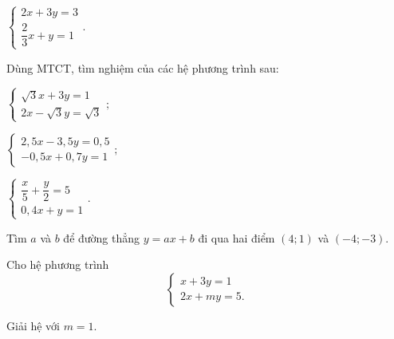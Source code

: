 \begin{practice}
\begin{questions}[resume=SBT]
\begin{questions}
            \answerline
            \answerline
            \answerline

            \item $\begin{cases}2x+3y=3\\\dfrac{2}{3}x+y=1\end{cases}.$

            \answerline
            \answerline
            \answerline
        \end{questions}

        \item Dùng MTCT, tìm nghiệm của các hệ phương trình sau:
        \begin{questions}
            \item $\begin{cases}\sqrt{3}x+3y=1\\2x-\sqrt{3}y=\sqrt{3}\end{cases};$

            \answerline

            \item $\begin{cases}2{,}5x-3{,}5y=0{,}5\\-0{,}5x+0{,}7y=1\end{cases};$

            \answerline

            \item $\begin{cases}\dfrac{x}{5}+\dfrac{y}{2}=5\\0{,}4x+y=1\end{cases}.$

            \answerline
        \end{questions}

        \item Tìm $a$ và $b$ để đường thẳng $y=ax+b$ đi qua hai điểm $(4;1)$ và $(-4;-3)$.

        \answerline
        \answerline

        \item Cho hệ phương trình
        \[
            \begin{cases}
                x+3y=1\\
                2x+my=5.
            \end{cases}
        \]
        \begin{questions}
            \item Giải hệ với $m=1$.


\end{questions}
\end{questions}
\end{practice}
